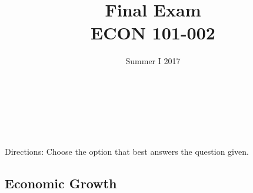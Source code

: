 \documentclass[addpoints,11pt]{exam}
\theoremstyle{definition}
\newcommand{\dd}[1]{}
\begin{document}
	
\title{\textbf{Final Exam} \\ \dd{Solutions\\} \vspace{2 mm} {\large ECON 101-002}}
\author{Summer I 2017}
\date{}
\maketitle

\\

\\

\\

\\

Directions: Choose the option that best answers the question given. 

\subsection*{Economic Growth}
\end{document}
